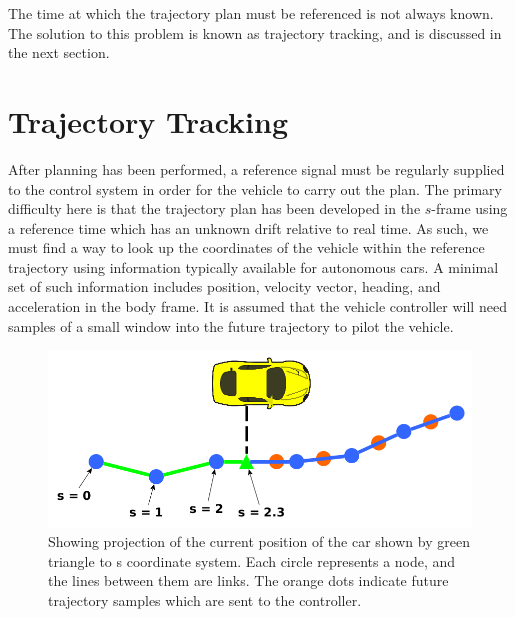 \documentclass[letterpaper, 10 pt, conference]{ieeeconf}  %
\begin{document}

The time at which the trajectory plan must be referenced is not always known.
The solution to this problem is known as trajectory tracking, and is discussed in the next section.



\section{Trajectory Tracking} \label{sec:trajectorytracking}

After planning has been performed, a reference signal must be regularly supplied to the control system in order for the vehicle to carry out the plan.
The primary difficulty here is that the trajectory plan has been developed in the $s$-frame using a reference time which has an unknown drift relative to real time.
As such, we must find a way to look up the coordinates of the vehicle within the reference trajectory using information typically available for autonomous cars.
A minimal set of such information includes position, velocity vector, heading, and acceleration in the body frame.
It is assumed that the vehicle controller will need samples of a small window into the future trajectory to pilot the vehicle.

\begin{figure}[tb]
  \centering
  \includegraphics[width=0.65\columnwidth]{graphics/PathProjectionSlice.png}
  \caption{Showing projection of the current position of the car shown by green triangle to s coordinate system. Each circle represents a node, and the lines between them are links. The orange dots indicate future trajectory samples which are sent to the controller.
  }

  \label{fig:cartos}
\end{figure}
\end{document}
